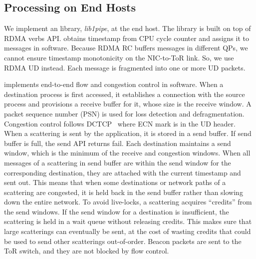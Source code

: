 \subsection{Processing on End Hosts}



We implement an \sys{} library, \textit{lib1pipe}, at the end host. The library is built on top of RDMA verbs API.
\sys{} obtains timestamp from CPU cycle counter and assigns it to messages in software.
Because RDMA RC buffers messages in different QPs, we cannot ensure timestamp monotonicity on the NIC-to-ToR link.
So, we use RDMA UD instead.
Each \sys{} message is fragmented into one or more UD packets.%

\sys{} implements end-to-end flow and congestion control in software. When a destination process is first accessed, it establishes a connection with the source process and provisions a receive buffer for it, whose size is the receive window. A packet sequence number (PSN) is used for loss detection and defragmentation. Congestion control follows DCTCP~\cite{alizadeh2010data} where ECN mark is in the UD header. When a scattering is sent by the application, it is stored in a send buffer. If send buffer is full, the send API returns fail.
Each destination maintains a send window, which is the minimum of the receive and congestion windows.
When all messages of a scattering in send buffer are within the send window for the corresponding destination, they are attached with the current timestamp and sent out.
This means that when some destinations or network paths of a scattering are congested, it is held back in the send buffer rather than slowing down the entire network.
To avoid live-locks, a scattering acquires ``credits'' from the send windows. If the send window for a destination is insufficient, the scattering is held in a wait queue without releasing credits. This makes sure that large scatterings can eventually be sent, at the cost of wasting credits that could be used to send other scatterings out-of-order.
Beacon packets are sent to the ToR switch, and they are not blocked by flow control.

